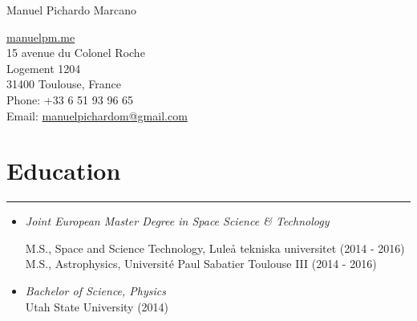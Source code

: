 \documentclass[letterpaper,10pt]{article}
\def\name{Manuel Pichardo Marcano}
\begin{document}
\begin{huge}
\name
\end{huge}





\vspace{.3 cm}

\begin{minipage}{0.6\linewidth}
  \href{www.manuelpm.me}{manuelpm.me} \\
15 avenue du Colonel Roche \\
Logement 1204 \\
31400 Toulouse, France\\
Phone: +33 6 51 93 96 65 \\
 Email: \href{mailto:manuelpichardom@gmail.com}{ manuelpichardom@gmail.com}
\end{minipage}

\section*{Education}

\hrule
\vspace{.3 cm}

\begin{itemize}[label=$\blacktriangleright$]
  \item \emph{Joint European Master Degree in Space Science \& Technology} 
  \begin{itemize}[label=]
     M.S., Space and Science Technology, Lule\r a tekniska universitet  (2014 - 2016) \\
     M.S., Astrophysics, Universit\'e Paul Sabatier Toulouse III (2014 - 2016) 
  \end{itemize}


  \item \emph{Bachelor of Science, Physics}  \\
   Utah State University (2014)

\end{itemize}
\end{document}
